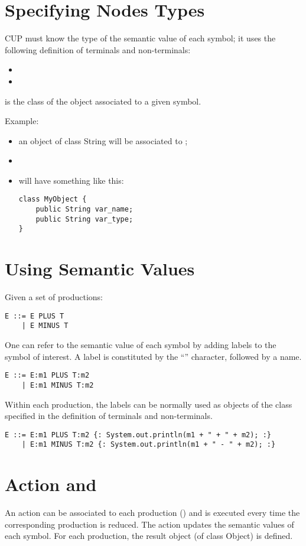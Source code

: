\section{Specifying Nodes Types}
CUP must know the type of the semantic value of each symbol; it uses the following definition of terminals and non-terminals:
\begin{itemize}
    \item
    \item
\end{itemize}
 is the class of the object associated to a given symbol.

Example:
\begin{itemize}
    \item
     an object of class String will be associated to ;
    \item
    \item
     will have something like this:
    \begin{lstlisting}
class MyObject {
    public String var_name;
    public String var_type;
}
    \end{lstlisting}
\end{itemize}

\section{Using Semantic Values}
Given a set of productions:
\begin{lstlisting}
E ::= E PLUS T
    | E MINUS T
\end{lstlisting}
One can refer to the semantic value of each symbol by adding labels to the symbol of interest.
A label is constituted by the ``\code{:}'' character, followed by a name.
\begin{lstlisting}
E ::= E:m1 PLUS T:m2
    | E:m1 MINUS T:m2
\end{lstlisting}
Within each production, the labels can be normally used as objects of the class specified in the definition of terminals and non-terminals.
\begin{lstlisting}
E ::= E:m1 PLUS T:m2 {: System.out.println(m1 + " + " + m2); :}
    | E:m1 MINUS T:m2 {: System.out.println(m1 + " - " + m2); :}
\end{lstlisting}

\section{Action and }
An action can be associated to each production () and is executed every time the corresponding production is reduced.
The action updates the semantic values of each symbol.
For each production, the result object (of class Object) is defined.

